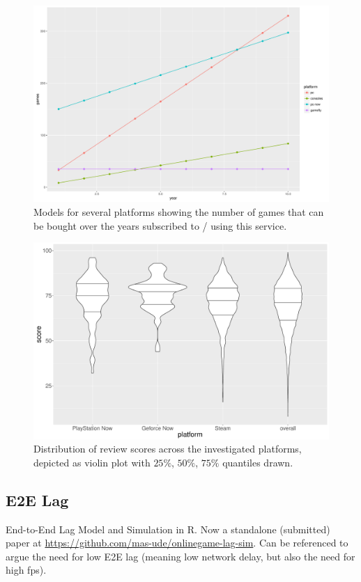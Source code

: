 \begin{figure}[!t]
	\centering
	\includegraphics[width=1.0\columnwidth]{images/games-over-year.pdf}
	\caption{Models for several platforms showing the number of games that can be bought over the years subscribed to / using this service.}
\label{fig:games-over-years}
\end{figure}



\begin{figure}[!t]
	\centering
	\includegraphics[width=1.0\columnwidth]{images/scores-by-platform-violin.pdf}
	\caption{Distribution of review scores across the investigated platforms, depicted as violin plot with $25\%$, $50\%$, $75\%$ quantiles drawn.}
\label{fig:scores-by-platform}
\end{figure}


\subsection{E2E Lag}
End-to-End Lag Model and Simulation in R. Now a standalone (submitted) paper at \url{https://github.com/mas-ude/onlinegame-lag-sim}. Can be referenced to argue the need for low E2E lag (meaning low network delay, but also the need for high fps).


